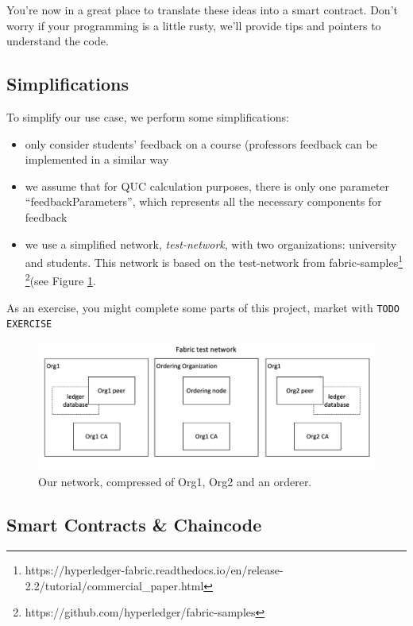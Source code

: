 \documentclass[12pt,a4paper]{article}
\theoremstyle{definition}
\begin{document}
 
You’re now in a great place to translate these ideas into a smart contract. Don’t worry if your programming is a little rusty, we’ll provide tips and pointers to understand the code. 

\subsection{Simplifications}
To simplify our use case, we perform some simplifications:

\begin{itemize}
    \item  only consider students' feedback on a course (professors feedback can be implemented in a similar way
    \item we assume that for QUC calculation purposes, there is only one parameter ``feedbackParameters'', which represents all the necessary components for feedback
    \item we use a simplified network, \emph{test-network}, with two organizations: university and students. This network is based on the test-network from fabric-samples\footnote{https://hyperledger-fabric.readthedocs.io/en/release-2.2/tutorial/commercial\_paper.html} \footnote{https://github.com/hyperledger/fabric-samples}(see Figure \ref{fig:network}.
\end{itemize}

As an exercise, you might complete some parts of this project, market with \texttt{TODO EXERCISE}
 
\begin{figure}[h]
    \centering
    \includegraphics[scale=0.6]{figures/commercial_paper.diagram.testnet.png}
    \caption{Our network, compressed of Org1, Org2 and an orderer.}
    \label{fig:network}
\end{figure}


\subsection{Smart Contracts \& Chaincode}
\end{document}
